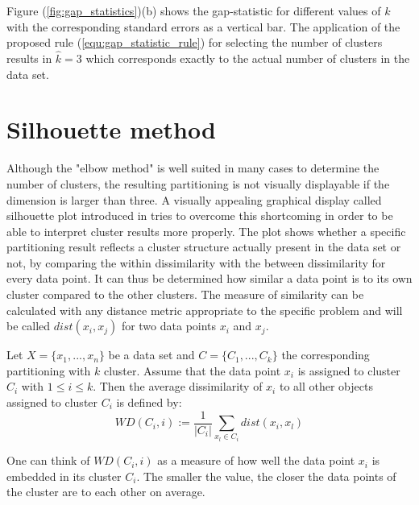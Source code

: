 Figure (\ref{fig:gap_statistics})(b) shows the gap-statistic for different values of $k$ with the corresponding standard errors as a vertical bar. The application of the proposed rule (\ref{equ:gap_statistic_rule}) for selecting the number of clusters results in $\hat{k} = 3$ which corresponds exactly to the actual number of clusters in the data set. 

\section{Silhouette method}\label{sec:silhouette}

Although the "elbow method" is well suited in many cases to determine the number of clusters, the resulting partitioning is not visually displayable if the dimension is larger than three. A visually appealing graphical display called silhouette plot introduced in \cite{rousseeuw1987silhouettes} tries to overcome this shortcoming in order to be able to interpret cluster results more properly. The plot shows whether a specific partitioning result reflects a cluster structure actually present in the data set or not, by comparing the within dissimilarity with the between dissimilarity for every data point. It can thus be determined how similar a data point is to its own cluster compared to the other clusters. The measure of similarity can be calculated with any distance metric appropriate to the specific problem and will be called $dist(x_i, x_j)$ for two data points $x_i$ and $x_j$.

\begin{definition}
	Let $X=\{x_1, ..., x_n\}$ be a data set and $C=\{C_1, ..., C_k\}$ the corresponding partitioning with $k$ cluster. Assume that the data point $x_i$ is assigned to cluster $C_i$ with $1 \leq i \leq k$. Then the average dissimilarity of $x_i$ to all other objects assigned to cluster $C_i$ is defined by: 
	\begin{equation*}\label{equ:dist_A}
	WD(C_i,i) := \frac{1}{|C_i|}\sum_{x_l \in C_i} dist(x_i, x_l)
	\end{equation*}
\end{definition}

One can think of $WD(C_i,i)$ as a measure of how well the data point $x_i$ is embedded in its cluster $C_i$. The smaller the value, the closer the data points of the cluster are to each other on average. 

